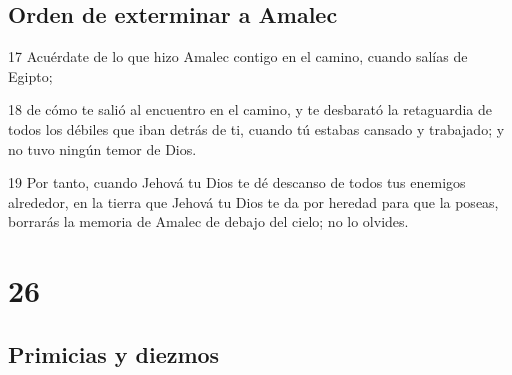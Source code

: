 \section{Orden de exterminar a Amalec}

\par 17 Acuérdate de lo que hizo Amalec contigo en el camino, cuando salías de Egipto;
\par 18 de cómo te salió al encuentro en el camino, y te desbarató la retaguardia de todos los débiles que iban detrás de ti, cuando tú estabas cansado y trabajado; y no tuvo ningún temor de Dios.
\par 19 Por tanto, cuando Jehová tu Dios te dé descanso de todos tus enemigos alrededor, en la tierra que Jehová tu Dios te da por heredad para que la poseas, borrarás la memoria de Amalec de debajo del cielo; no lo olvides. 

\chapter{26}

\section{Primicias y diezmos}

